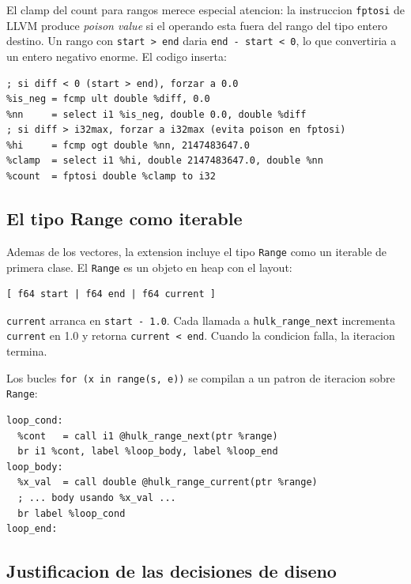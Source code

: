 \documentclass[12pt,a4paper]{article}
\begin{document}
El clamp del count para rangos merece especial atencion: la instruccion \texttt{fptosi}
de LLVM produce \textit{poison value} si el operando esta fuera del rango del tipo
entero destino. Un rango con \texttt{start > end} daria \texttt{end - start < 0},
lo que convertiria a un entero negativo enorme. El codigo inserta:

\begin{lstlisting}[style=llvmir, caption={Clamp del count en generador de rango}]
%diff   = fsub double %end, %start
; si diff < 0 (start > end), forzar a 0.0
%is_neg = fcmp ult double %diff, 0.0
%nn     = select i1 %is_neg, double 0.0, double %diff
; si diff > i32max, forzar a i32max (evita poison en fptosi)
%hi     = fcmp ogt double %nn, 2147483647.0
%clamp  = select i1 %hi, double 2147483647.0, double %nn
%count  = fptosi double %clamp to i32
\end{lstlisting}

\subsection{El tipo Range como iterable}

Ademas de los vectores, la extension incluye el tipo \texttt{Range} como un iterable
de primera clase. El \texttt{Range} es un objeto en heap con el layout:

\begin{verbatim}
[ f64 start | f64 end | f64 current ]
\end{verbatim}

\texttt{current} arranca en \texttt{start - 1.0}. Cada llamada a
\texttt{hulk\_range\_next} incrementa \texttt{current} en 1.0 y retorna
\texttt{current < end}. Cuando la condicion falla, la iteracion termina.

Los bucles \texttt{for (x in range(s, e))} se compilan a un patron de iteracion
sobre \texttt{Range}:

\begin{lstlisting}[style=llvmir, caption={Compilacion de for (x in range(0, 3)) body}]
  %range  = call ptr @hulk_range_alloc(double 0.0, double 3.0)
loop_cond:
  %cont   = call i1 @hulk_range_next(ptr %range)
  br i1 %cont, label %loop_body, label %loop_end
loop_body:
  %x_val  = call double @hulk_range_current(ptr %range)
  ; ... body usando %x_val ...
  br label %loop_cond
loop_end:
\end{lstlisting}

\subsection{Justificacion de las decisiones de diseno}
\end{document}
